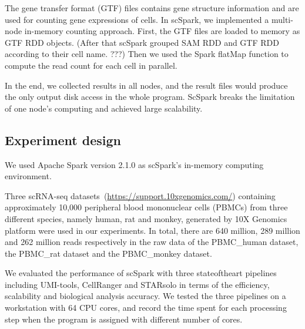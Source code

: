 \documentclass[conference]{IEEEtran}
\begin{document}
The gene transfer format (GTF) files contains gene structure information and are used for counting gene expressions of cells.  
In scSpark, we implemented a multi-node in-memory counting approach. 
First, the GTF files are loaded to memory as GTF RDD objects. 
(After that scSpark grouped SAM RDD and GTF RDD according to their cell name. ???)
Then we used the Spark flatMap function to compute the read count for each cell in parallel. 

In the end, we collected results in all nodes, and the result files would produce the only output disk access in the whole program. 
ScSpark breaks the limitation of one node's computing and achieved large scalability. 

\subsection{Experiment design}
We used Apache Spark version 2.1.0 as scSpark's in-memory computing environment.

Three scRNA-seq datasets~(\url{https://support.10xgenomics.com/}) containing approximately 10,000 peripheral blood mononuclear cells (PBMCs) from three different species, namely human, rat and monkey, generated by 10X Genomics platform were used in our experiments. In total, there are 640 million, 289 million and 262 million reads respectively in the raw data of the PBMC\_human dataset, the PBMC\_rat dataset and the PBMC\_monkey dataset.

We evaluated the performance of scSpark with three state\-of\-the\-art pipelines including UMI-tools, CellRanger and STARsolo in terms of the efficiency, scalability and biological analysis accuracy.
We tested the three pipelines on a workstation with 64 CPU cores, and record the time spent for each processing step when the program is assigned with different number of cores. 

\end{document}
